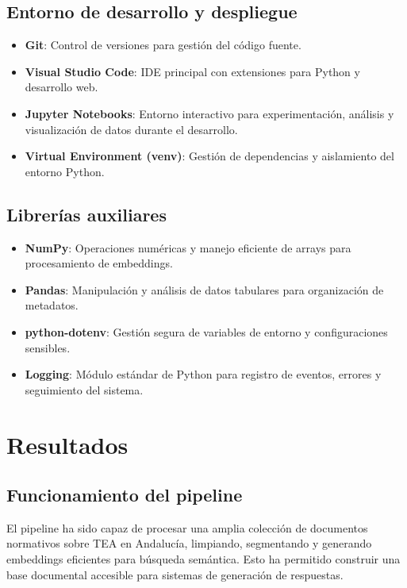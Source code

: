 \documentclass[a4paper,12pt]{article}
\begin{document}
\subsection{Entorno de desarrollo y despliegue}

\begin{itemize}
    \item \textbf{Git}: Control de versiones para gestión del código fuente.
    \item \textbf{Visual Studio Code}: IDE principal con extensiones para Python y desarrollo web.
    \item \textbf{Jupyter Notebooks}: Entorno interactivo para experimentación, análisis y visualización de datos durante el desarrollo.
    \item \textbf{Virtual Environment (venv)}: Gestión de dependencias y aislamiento del entorno Python.
\end{itemize}

\subsection{Librerías auxiliares}

\begin{itemize}
    \item \textbf{NumPy}: Operaciones numéricas y manejo eficiente de arrays para procesamiento de embeddings.
    \item \textbf{Pandas}: Manipulación y análisis de datos tabulares para organización de metadatos.
    \item \textbf{python-dotenv}: Gestión segura de variables de entorno y configuraciones sensibles.
    \item \textbf{Logging}: Módulo estándar de Python para registro de eventos, errores y seguimiento del sistema.
\end{itemize}


\section{Resultados}

\subsection{Funcionamiento del pipeline}

El pipeline ha sido capaz de procesar una amplia colección de documentos normativos sobre TEA en Andalucía, limpiando, segmentando y generando embeddings eficientes para búsqueda semántica. Esto ha permitido construir una base documental accesible para sistemas de generación de respuestas.
\end{document}
